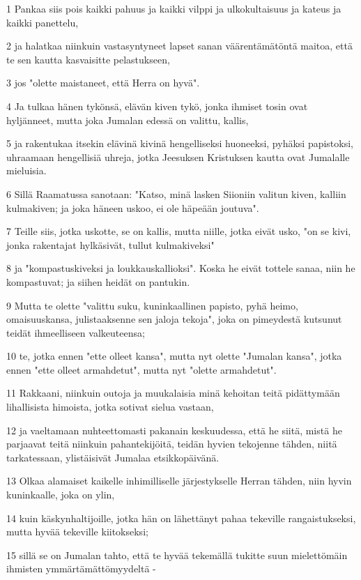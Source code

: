 \par 1 Pankaa siis pois kaikki pahuus ja kaikki vilppi ja ulkokultaisuus ja kateus ja kaikki panettelu,
\par 2 ja halatkaa niinkuin vastasyntyneet lapset sanan väärentämätöntä maitoa, että te sen kautta kasvaisitte pelastukseen,
\par 3 jos "olette maistaneet, että Herra on hyvä".
\par 4 Ja tulkaa hänen tykönsä, elävän kiven tykö, jonka ihmiset tosin ovat hyljänneet, mutta joka Jumalan edessä on valittu, kallis,
\par 5 ja rakentukaa itsekin elävinä kivinä hengelliseksi huoneeksi, pyhäksi papistoksi, uhraamaan hengellisiä uhreja, jotka Jeesuksen Kristuksen kautta ovat Jumalalle mieluisia.
\par 6 Sillä Raamatussa sanotaan: "Katso, minä lasken Siioniin valitun kiven, kalliin kulmakiven; ja joka häneen uskoo, ei ole häpeään joutuva".
\par 7 Teille siis, jotka uskotte, se on kallis, mutta niille, jotka eivät usko, "on se kivi, jonka rakentajat hylkäsivät, tullut kulmakiveksi"
\par 8 ja "kompastuskiveksi ja loukkauskallioksi". Koska he eivät tottele sanaa, niin he kompastuvat; ja siihen heidät on pantukin.
\par 9 Mutta te olette "valittu suku, kuninkaallinen papisto, pyhä heimo, omaisuuskansa, julistaaksenne sen jaloja tekoja", joka on pimeydestä kutsunut teidät ihmeelliseen valkeuteensa;
\par 10 te, jotka ennen "ette olleet kansa", mutta nyt olette "Jumalan kansa", jotka ennen "ette olleet armahdetut", mutta nyt "olette armahdetut".
\par 11 Rakkaani, niinkuin outoja ja muukalaisia minä kehoitan teitä pidättymään lihallisista himoista, jotka sotivat sielua vastaan,
\par 12 ja vaeltamaan nuhteettomasti pakanain keskuudessa, että he siitä, mistä he parjaavat teitä niinkuin pahantekijöitä, teidän hyvien tekojenne tähden, niitä tarkatessaan, ylistäisivät Jumalaa etsikkopäivänä.
\par 13 Olkaa alamaiset kaikelle inhimilliselle järjestykselle Herran tähden, niin hyvin kuninkaalle, joka on ylin,
\par 14 kuin käskynhaltijoille, jotka hän on lähettänyt pahaa tekeville rangaistukseksi, mutta hyvää tekeville kiitokseksi;
\par 15 sillä se on Jumalan tahto, että te hyvää tekemällä tukitte suun mielettömäin ihmisten ymmärtämättömyydeltä -
